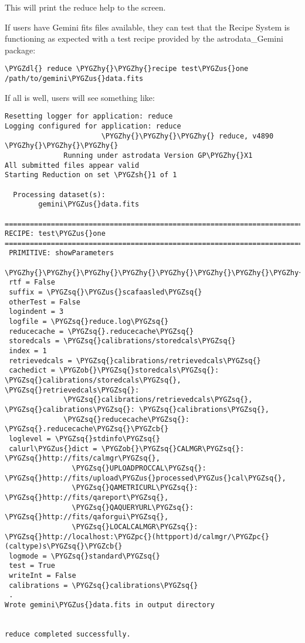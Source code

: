 \documentclass[letterpaper,10pt,english]{sphinxmanual}
\def\PYGZus{\char`\_}
\def\PYGZob{\char`\{}
\def\PYGZcb{\char`\}}
\def\PYGZsh{\char`\#}
\def\PYGZpc{\char`\%}
\def\PYGZdl{\char`\$}
\def\PYGZhy{\char`\-}
\def\PYGZsq{\char`\'}
\begin{document}
This will print the reduce help to the screen.

If users have Gemini fits files available, they can test that the Recipe System
is functioning as expected with a test recipe provided by the astrodata\_Gemini
package:

\begin{Verbatim}[commandchars=\\\{\}]
\PYGZdl{} reduce \PYGZhy{}\PYGZhy{}recipe test\PYGZus{}one /path/to/gemini\PYGZus{}data.fits
\end{Verbatim}

If all is well, users will see something like:

\begin{Verbatim}[commandchars=\\\{\}]
Resetting logger for application: reduce
Logging configured for application: reduce
                       \PYGZhy{}\PYGZhy{}\PYGZhy{} reduce, v4890  \PYGZhy{}\PYGZhy{}\PYGZhy{}
              Running under astrodata Version GP\PYGZhy{}X1
All submitted files appear valid
Starting Reduction on set \PYGZsh{}1 of 1

  Processing dataset(s):
        gemini\PYGZus{}data.fits

==============================================================================
RECIPE: test\PYGZus{}one
==============================================================================
 PRIMITIVE: showParameters
 \PYGZhy{}\PYGZhy{}\PYGZhy{}\PYGZhy{}\PYGZhy{}\PYGZhy{}\PYGZhy{}\PYGZhy{}\PYGZhy{}\PYGZhy{}\PYGZhy{}\PYGZhy{}\PYGZhy{}\PYGZhy{}\PYGZhy{}\PYGZhy{}\PYGZhy{}\PYGZhy{}\PYGZhy{}\PYGZhy{}\PYGZhy{}\PYGZhy{}\PYGZhy{}\PYGZhy{}\PYGZhy{}
 rtf = False
 suffix = \PYGZsq{}\PYGZus{}scafaasled\PYGZsq{}
 otherTest = False
 logindent = 3
 logfile = \PYGZsq{}reduce.log\PYGZsq{}
 reducecache = \PYGZsq{}.reducecache\PYGZsq{}
 storedcals = \PYGZsq{}calibrations/storedcals\PYGZsq{}
 index = 1
 retrievedcals = \PYGZsq{}calibrations/retrievedcals\PYGZsq{}
 cachedict = \PYGZob{}\PYGZsq{}storedcals\PYGZsq{}: \PYGZsq{}calibrations/storedcals\PYGZsq{}, \PYGZsq{}retrievedcals\PYGZsq{}:
              \PYGZsq{}calibrations/retrievedcals\PYGZsq{}, \PYGZsq{}calibrations\PYGZsq{}: \PYGZsq{}calibrations\PYGZsq{},
              \PYGZsq{}reducecache\PYGZsq{}: \PYGZsq{}.reducecache\PYGZsq{}\PYGZcb{}
 loglevel = \PYGZsq{}stdinfo\PYGZsq{}
 calurl\PYGZus{}dict = \PYGZob{}\PYGZsq{}CALMGR\PYGZsq{}: \PYGZsq{}http://fits/calmgr\PYGZsq{},
                \PYGZsq{}UPLOADPROCCAL\PYGZsq{}: \PYGZsq{}http://fits/upload\PYGZus{}processed\PYGZus{}cal\PYGZsq{},
                \PYGZsq{}QAMETRICURL\PYGZsq{}: \PYGZsq{}http://fits/qareport\PYGZsq{},
                \PYGZsq{}QAQUERYURL\PYGZsq{}: \PYGZsq{}http://fits/qaforgui\PYGZsq{},
                \PYGZsq{}LOCALCALMGR\PYGZsq{}: \PYGZsq{}http://localhost:\PYGZpc{}(httpport)d/calmgr/\PYGZpc{}(caltype)s\PYGZsq{}\PYGZcb{}
 logmode = \PYGZsq{}standard\PYGZsq{}
 test = True
 writeInt = False
 calibrations = \PYGZsq{}calibrations\PYGZsq{}
 .
Wrote gemini\PYGZus{}data.fits in output directory


reduce completed successfully.
\end{Verbatim}
\end{document}
